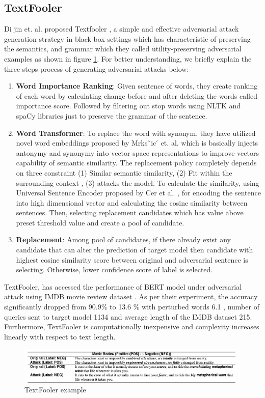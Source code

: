 \documentclass[%
	BCOR=8mm, %
	DIV=12, 
	toc=bibliography, %
	toc=listof, %
	oneside, %
	egregdoesnotlikesansseriftitles, %
	]{scrbook}
\begin{document}
\subsection{TextFooler}
Di jin et$.$ al$.$ proposed Textfooler \cite{jia_certified_2019}, a simple and effective adversarial attack generation strategy in black box settings which has characteristic of preserving the semantics, and grammar which they called utility-preserving adversarial examples as shown in figure \ref{diag:TextFoolerExp}. For better understanding, we briefly explain the three steps process of generating adversarial attacks below:
\begin{enumerate}
\item  \textbf{Word Importance Ranking}: Given sentence of words, they create ranking of each word by calculating change before and after deleting the words called importance score. Followed by filtering out stop words using NLTK and spaCy libraries just to preserve the grammar of the sentence. 
\item \textbf{Word Transformer}: To replace the word with synonym, they have utilized novel word embeddings proposed by Mrksˇic ́ et$.$ al$.$ \cite{mrksic_counter-fitting_2016} which is basically injects antonymy and synonymy into vector space representations to improve vectors capability of semantic similarity. The replacement policy completely depends on three constraint (1) Similar semantic similarity, (2) Fit within the surrounding context , (3) attacks the model. To calculate the similarity,  using Universal Sentence Encoder proposed by Cer et al. \cite{cer_universal_2018}, for encoding the sentence into high dimensional vector and calculating the cosine similarity between sentences. Then, selecting replacement candidates which has value above preset threshold value and create a pool of candidate. 
\item \textbf{Replacement}: Among pool of candidates, if there already exist any candidate that can alter the prediction of target model then candidate with highest cosine similarity score between original and adversarial sentence is selecting. Otherwise, lower confidence score of label  is selected.  
\end{enumerate}
TextFooler, has accessed the performance of BERT model under adversarial attack  using IMDB movie review dataset . As per their experiment, the accuracy significantly dropped from 90.9\% to 13.6 \% with perturbed words 6.1 , number of queries sent to target model 1134 and average length of the IMDB dataset 215. Furthermore,  TextFooler is computationally inexpensive and complexity increases linearly with respect to text length.
\begin{figure}[h!]
\centering
\includegraphics[width=.9\textwidth]{img/textfooler_example.png}
\caption{TextFooler example  \cite{jia_certified_2019} }
\label{diag:TextFoolerExp}
\end{figure}
\end{document}

